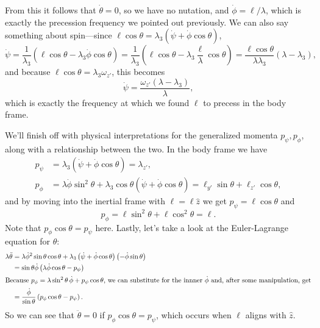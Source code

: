 \documentclass[../p111main.tex]{subfiles}
\begin{document}
From this it follows that $\dot \theta = 0$, so we have no nutation, and $\dot \phi = \ell / \lambda$, which is exactly the precession frequency we pointed out previously.
We can also say something about spin---since $\ell \cos \theta = \lambda_3 (\dot \psi + \dot \phi \cos \theta)$,
\[ \dot \psi = \frac{1}{\lambda_3} \left( \ell \cos \theta - \lambda_3 \dot \phi \cos \theta \right) = \frac{1}{\lambda_3} \left( \ell \cos \theta - \lambda_3 \frac{\ell}{\lambda} \cos \theta \right) = \frac{\ell \cos \theta}{\lambda \lambda_3} (\lambda - \lambda_3), \]
and because $\ell \cos \theta = \lambda_3 \omega_{z'}$, this becomes
\[ \dot \psi = \frac{\omega_{z'} (\lambda - \lambda_3)}{\lambda}, \]
which is exactly the frequency at which we found $\bm \ell$ to precess in the body frame.

We'll finish off with physical interpretations for the generalized momenta $p_\psi, p_\phi$, along with a relationship between the two.
In the body frame we have
\begin{align*}
    p_\psi &= \lambda_3 \left( \dot \psi + \dot \phi \cos \theta \right) = \lambda_{z'}, \\
    p_\phi &= \lambda \dot \phi \sin^2 \theta + \lambda_3 \cos \theta \left( \dot \psi + \dot \phi \cos \theta \right) = \ell_{y'} \sin \theta + \ell_{z'} \cos \theta,
\end{align*}
and by moving into the inertial frame with $\bm \ell = \ell \hat z$ we get $p_\psi = \ell \cos \theta$ and
\[ p_\phi = \ell \sin^2 \theta + \ell \cos^2 \theta = \ell. \]
Note that $p_\phi \cos \theta = p_\psi$ here.
Lastly, let's take a look at the Euler-Lagrange equation for $\theta$:
\begin{align*}
    \lambda \ddot \theta &= \lambda \dot \phi^2 \sin\theta \cos\theta + \lambda_3 \left( \dot \psi + \dot \phi \cos \theta \right) \left( - \dot \phi \sin \theta \right) \\
    &= \sin \theta \dot \phi \left( \lambda \dot \phi \cos \theta - p_\psi \right) \\
    \intertext{Because $p_\phi = \lambda \sin^2 \theta \,\dot \phi + p_\psi \cos \theta$, we can substitute for the innner $\dot \phi$ and, after some manipulation, get}
    &= \frac{\dot \phi}{\sin \theta} \left( p_\phi \cos \theta - p_\psi \right).
\end{align*}
So we can see that $\ddot \theta = 0$ if $p_\phi \cos \theta = p_\psi$, which occurs when $\bm \ell$ aligns with $\hat z$.
\end{document}
